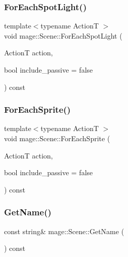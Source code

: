 \hypertarget{classmage_1_1_scene_af7419b0edf8a0cae6b113d18231a910a}{}\label{classmage_1_1_scene_af7419b0edf8a0cae6b113d18231a910a} 
\subsubsection{\texorpdfstring{For\+Each\+Spot\+Light()}{ForEachSpotLight()}}
{\footnotesize\ttfamily template$<$typename ActionT $>$ \\
void mage\+::\+Scene\+::\+For\+Each\+Spot\+Light (\begin{DoxyParamCaption}\item[{ActionT}]{action,  }\item[{bool}]{include\+\_\+passive = {\ttfamily false} }\end{DoxyParamCaption}) const}

\hypertarget{classmage_1_1_scene_af33b14f081e0b3ae5dafc807bb6bf5b4}{}\label{classmage_1_1_scene_af33b14f081e0b3ae5dafc807bb6bf5b4} 
\subsubsection{\texorpdfstring{For\+Each\+Sprite()}{ForEachSprite()}}
{\footnotesize\ttfamily template$<$typename ActionT $>$ \\
void mage\+::\+Scene\+::\+For\+Each\+Sprite (\begin{DoxyParamCaption}\item[{ActionT}]{action,  }\item[{bool}]{include\+\_\+passive = {\ttfamily false} }\end{DoxyParamCaption}) const}

\hypertarget{classmage_1_1_scene_a6afd25c30d08eb579eb430af49cf8fc0}{}\label{classmage_1_1_scene_a6afd25c30d08eb579eb430af49cf8fc0} 
\subsubsection{\texorpdfstring{Get\+Name()}{GetName()}}
{\footnotesize\ttfamily const string\& mage\+::\+Scene\+::\+Get\+Name (\begin{DoxyParamCaption}{ }\end{DoxyParamCaption}) const\hspace{0.3cm}{\ttfamily [noexcept]}}

